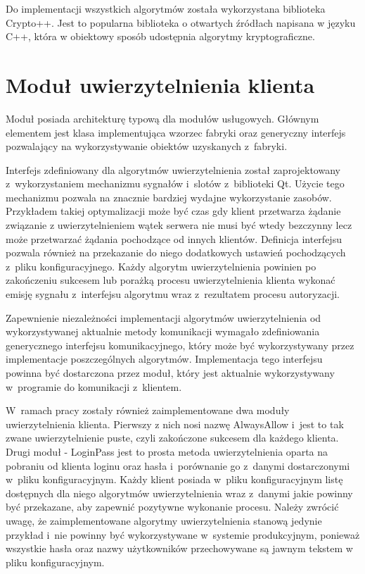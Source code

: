 Do implementacji wszystkich algorytmów została wykorzystana biblioteka
Crypto++. Jest to popularna biblioteka o otwartych źródłach napisana w
języku C++, która w obiektowy sposób udostępnia algorytmy
kryptograficzne.

\section[Moduł uwierzytelnienia][Moduł uwierzytelnienia klienta]{Moduł uwierzytelnienia klienta}

Moduł posiada architekturę typową dla modułów usługowych. Głównym
elementem jest klasa implementująca wzorzec fabryki oraz generyczny
interfejs pozwalający na wykorzystywanie obiektów uzyskanych
z~fabryki.

Interfejs zdefiniowany dla algorytmów uwierzytelnienia został
zaprojektowany z~wykorzystaniem mechanizmu sygnałów i~slotów
z~biblioteki Qt. Użycie tego mechanizmu pozwala na znacznie bardziej
wydajne wykorzystanie zasobów. Przykładem takiej optymalizacji może być
czas gdy klient przetwarza żądanie związanie z uwierzytelnieniem wątek
serwera nie musi być wtedy bezczynny lecz może przetwarzać żądania
pochodzące od innych klientów. Definicja interfejsu pozwala również na
przekazanie do niego dodatkowych ustawień pochodzących z~pliku
konfiguracyjnego. Każdy algorytm uwierzytelnienia powinien po
zakończeniu sukcesem lub porażką procesu uwierzytelnienia klienta
wykonać emisję sygnału z~interfejsu algorytmu wraz z~rezultatem
procesu autoryzacji.

Zapewnienie niezależności implementacji algorytmów uwierzytelnienia od
wykorzystywanej aktualnie metody komunikacji wymagało zdefiniowania
generycznego interfejsu komunikacyjnego, który może być wykorzystywany
przez implementacje poszczególnych algorytmów. Implementacja tego
interfejsu powinna być dostarczona przez moduł, który jest aktualnie
wykorzystywany w~programie do komunikacji z~klientem.

W~ramach pracy zostały również zaimplementowane dwa moduły
uwierzytelnienia klienta. Pierwszy z nich nosi nazwę AlwaysAllow
i~jest to tak zwane uwierzytelnienie puste, czyli zakończone sukcesem
dla każdego klienta. Drugi moduł - LoginPass jest to prosta metoda
uwierzytelnienia oparta na pobraniu od klienta loginu oraz hasła
i~porównanie go z~danymi dostarczonymi w~pliku konfiguracyjnym. Każdy
klient posiada w~pliku konfiguracyjnym listę dostępnych dla niego
algorytmów uwierzytelnienia wraz z~danymi jakie powinny być
przekazane, aby zapewnić pozytywne wykonanie procesu. Należy zwrócić
uwagę, że zaimplementowane algorytmy uwierzytelnienia stanową jedynie
przykład i~nie powinny być wykorzystywane w~systemie produkcyjnym,
ponieważ wszystkie hasła oraz nazwy użytkowników przechowywane są
jawnym tekstem w pliku konfiguracyjnym.

